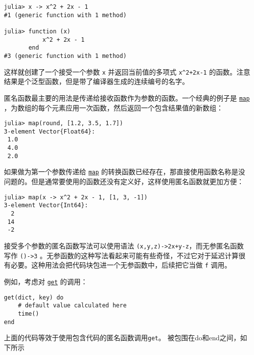 \begin{verbatim}
julia> x -> x^2 + 2x - 1
#1 (generic function with 1 method)

julia> function (x)
           x^2 + 2x - 1
       end
#3 (generic function with 1 method)
\end{verbatim}



这样就创建了一个接受一个参数 \texttt{x} 并返回当前值的多项式 \texttt{x{\textasciicircum}2+2x-1} 的函数。注意结果是个泛型函数，但是带了编译器生成的连续编号的名字。



匿名函数最主要的用法是传递给接收函数作为参数的函数。一个经典的例子是 \hyperlink{11483231213869150535}{\texttt{map}} ，为数组的每个元素应用一次函数，然后返回一个包含结果值的新数组：




\begin{verbatim}
julia> map(round, [1.2, 3.5, 1.7])
3-element Vector{Float64}:
 1.0
 4.0
 2.0
\end{verbatim}



如果做为第一个参数传递给 \hyperlink{11483231213869150535}{\texttt{map}} 的转换函数已经存在，那直接使用函数名称是没问题的。但是通常要使用的函数还没有定义好，这样使用匿名函数就更加方便：




\begin{verbatim}
julia> map(x -> x^2 + 2x - 1, [1, 3, -1])
3-element Vector{Int64}:
  2
 14
 -2
\end{verbatim}



接受多个参数的匿名函数写法可以使用语法 \texttt{(x,y,z)->2x+y-z}，而无参匿名函数写作 \texttt{()->3} 。无参函数的这种写法看起来可能有些奇怪，不过它对于延迟计算很有必要。这种用法会把代码块包进一个无参函数中，后续把它当做 \texttt{f} 调用。



例如，考虑对 \hyperlink{282460992333585641}{\texttt{get}} 的调用：




\begin{verbatim}
get(dict, key) do
    # default value calculated here
    time()
end
\end{verbatim}



上面的代码等效于使用包含代码的匿名函数调用\texttt{get}。 被包围在do和end之间，如下所示




